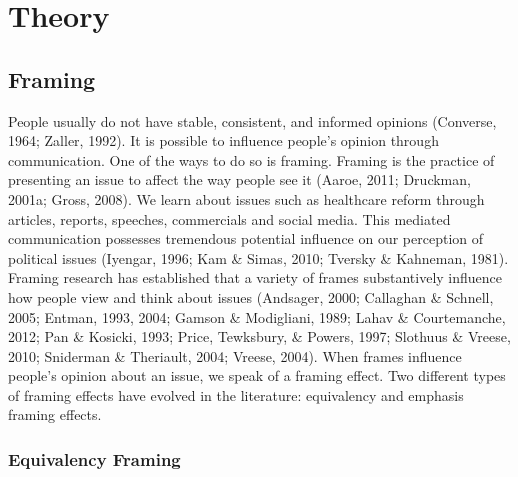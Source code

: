 \documentclass[12pt,econ]{sources/authesis}
\begin{document}
\hypertarget{framing-theory}{%
\section{Theory}\label{framing-theory}}

\hypertarget{framing-theory-framing}{%
\subsection{Framing}\label{framing-theory-framing}}

People usually do not have stable, consistent, and informed opinions (Converse, 1964; Zaller, 1992). It is possible to influence people's opinion through communication. One of the ways to do so is framing. Framing is the practice of presenting an issue to affect the way people see it (Aaroe, 2011; Druckman, 2001a; Gross, 2008). We learn about issues such as healthcare reform through articles, reports, speeches, commercials and social media. This mediated communication possesses tremendous potential influence on our perception of political issues (Iyengar, 1996; Kam \& Simas, 2010; Tversky \& Kahneman, 1981). Framing research has established that a variety of frames substantively influence how people view and think about issues (Andsager, 2000; Callaghan \& Schnell, 2005; Entman, 1993, 2004; Gamson \& Modigliani, 1989; Lahav \& Courtemanche, 2012; Pan \& Kosicki, 1993; Price, Tewksbury, \& Powers, 1997; Slothuus \& Vreese, 2010; Sniderman \& Theriault, 2004; Vreese, 2004). When frames influence people's opinion about an issue, we speak of a framing effect. Two different types of framing effects have evolved in the literature: equivalency and emphasis framing effects.

\hypertarget{framing-theory-framing-equiv}{%
\subsubsection{Equivalency Framing}\label{framing-theory-framing-equiv}}
\end{document}
